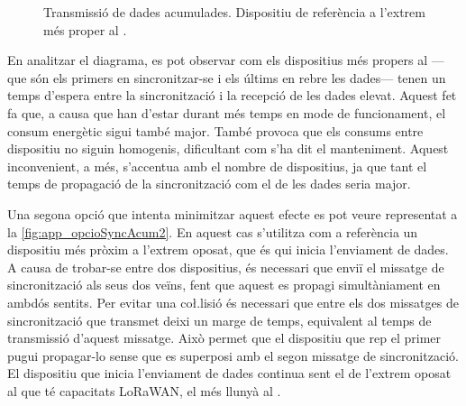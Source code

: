 \documentclass{tfgitic}[2024/07/01]
\begin{document}
{\begin{figure}[ht]
{\begin{tabular}{!{\vrule width \heavyrulewidth}c!{\vrule width \heavyrulewidth}ccccccccccccc!{\vrule width \heavyrulewidth}}
\toprule
\end{tabular}
}
\caption{Transmissió de dades acumulades. Dispositiu de referència a l'extrem més proper al .}
\label{fig:app_opcioSyncAcum1}
\end{figure}

En analitzar el diagrama, es pot observar com els dispositius més propers al  ---que són els primers en sincronitzar-se i els últims en rebre les dades---  tenen un temps d'espera entre la sincronització i la recepció de les dades elevat. Aquest fet fa que, a causa que han d'estar durant més temps en mode de funcionament, el consum energètic sigui també major. També provoca que els consums entre dispositiu no siguin homogenis, dificultant com s'ha dit el manteniment. Aquest inconvenient, a més, s'accentua amb el nombre de dispositius, ja que tant el temps de propagació de la sincronització com el de les dades seria major. 


Una segona opció que intenta minimitzar aquest efecte es pot veure representat a la \autoref{fig:app_opcioSyncAcum2}. En aquest cas s'utilitza com a referència un dispositiu més pròxim a l'extrem oposat, que és qui inicia l'enviament de dades. A causa de trobar-se entre dos dispositius, és necessari que enviï el missatge de sincronització als seus dos veïns, fent que aquest es propagi simultàniament en ambdós sentits. Per evitar una co\l.lisió és necessari que entre els dos missatges de sincronització que transmet deixi un marge de temps, equivalent al temps de transmissió d'aquest missatge. Això permet que el dispositiu que rep el primer pugui propagar-lo sense que es superposi amb el segon missatge de sincronització. El dispositiu que inicia l'enviament de dades continua sent el de l'extrem oposat al que té capacitats LoRaWAN, el més llunyà al .

\begin{figure}[ht]
    \centering
\setlength{\extrarowheight}{0pt}
\addtolength{\extrarowheight}{\aboverulesep}
\addtolength{\extrarowheight}{\belowrulesep}
\setlength{\aboverulesep}{0pt}
\setlength{\belowrulesep}{0pt}
\end{figure}}
\end{document}
